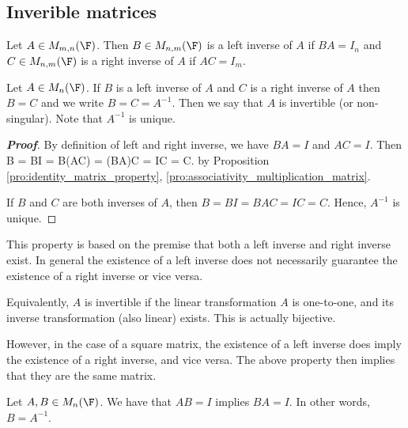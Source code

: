 \subsection{Inverible matrices}

\begin{definition}\label{def:inverse_left}
Let $A\in M_{m,n}(\F)$. Then $B\in M_{n,m}(\F)$ is a left inverse of $A$ if $BA =I_n$ and $C\in M_{n,m}(\F)$ is a right inverse of $A$ if $AC = I_m$.
\end{definition}

\begin{proposition}\label{pro:inverse_matrix}
Let $A\in M_n(\F)$. If $B$ is a left inverse of $A$ and $C$ is a right inverse of $A$ then $B=C$ and we write $B=C = A^{-1}$. Then we say that $A$ is invertible (or non-singular). Note that $A^{-1}$ is unique.
\end{proposition}

\begin{proof}[\bf Proof]
By definition of left and right inverse, we have $BA =I$ and $AC = I$. Then
\be
B = BI = B(AC) = (BA)C = IC = C.
\ee
by Proposition \ref{pro:identity_matrix_property}, \ref{pro:associativity_multiplication_matrix}.

If $B$ and $C$ are both inverses of $A$, then $B = BI = BAC = IC = C$. Hence, $A^{-1}$ is unique.
\end{proof}

\begin{remark}
This property is based on the premise that both a left inverse and right inverse exist. In general the existence of a left inverse does not necessarily guarantee the existence of a right inverse or
vice versa.

Equivalently, $A$ is invertible if the linear transformation $A$ is one-to-one, and its inverse transformation (also linear) exists. This is actually bijective.
\end{remark}

However, in the case of a square matrix, the existence of a left inverse does imply the existence of a right inverse, and vice versa. The above property then implies that they are the
same matrix.

\begin{proposition}\label{pro:left_or_right_inverse_of_square_matrix_implies_inverse}
Let $A,B\in M_n(\F)$. We have that $AB = I$ implies $BA=I$. In other words, $B = A^{-1}$.
\end{proposition}

